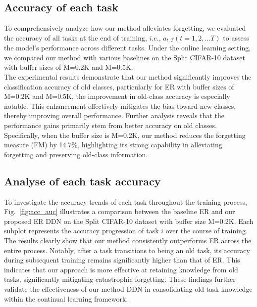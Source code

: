 \documentclass[table, xcdraw]{article}
\theoremstyle{plain}
\theoremstyle{definition}
\theoremstyle{remark}
\begin{document}
\subsection{Accuracy of each task}
To comprehensively analyze how our method alleviates forgetting, we evaluated the accuracy of all tasks at the end of training, $i.e.$, $a_{t,T} (t=1,2,...T)$  to assess the model's performance across different tasks. Under the online learning setting, we compared our method with various baselines on the Split CIFAR-10 dataset with buffer sizes of M=0.2K and M=0.5K.\\
The experimental results demonstrate that our method significantly improves the classification accuracy of old classes, particularly for ER with buffer sizes of M=0.2K and M=0.5K, the improvement in old-class accuracy is especially notable. This enhancement effectively mitigates the bias toward new classes, thereby improving overall performance. Further analysis reveals that the performance gains primarily stem from better accuracy on old classes. Specifically, when the buffer size is M=0.2K, our method reduces the forgetting measure (FM) by 14.7\%, highlighting its strong capability in alleviating forgetting and preserving old-class information.

\subsection{Analyse of each task accuracy} 
To investigate the accuracy trends of each task throughout the training process, Fig.~\ref{fig:acc_auc} illustrates a comparison between the baseline ER and our proposed ER DDN on the Split CIFAR-10 dataset with buffer size M=0.2K. Each subplot represents the accuracy progression of task $i$ over the course of training. The results clearly show that our method consistently outperforms ER across the entire process. Notably, after a task transitions to being an old task, its accuracy during subsequent training remains significantly higher than that of ER. This indicates that our approach is more effective at retaining knowledge from old tasks, significantly mitigating catastrophic forgetting. These findings further validate the effectiveness of our method DDN in consolidating old task knowledge within the continual learning framework.





\end{document}

